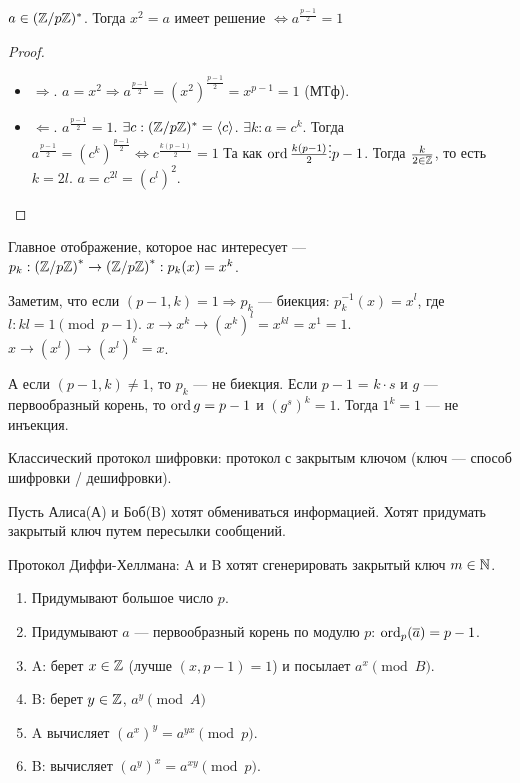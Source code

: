 \begin{theorem}
    $a \in (\mathbb{Z} / p \mathbb{Z})^*$. Тогда  $x^2 = a$ имеет решение  $\iff a^{\frac{p-1}{2}} = 1$
\end{theorem}
\begin{proof}
    \slashn
    \begin{itemize}
        \item $\Rightarrow$.  $a = x^2 \Rightarrow a^{\frac{p-1}{2}} = (x^2)^{\frac{p-1}{2}} = x^{p-1} = 1$ (МТф).
        \item $\Leftarrow$.  $a^{\frac{p-1}{2}} = 1$. $\exists c: (\mathbb{Z} / p \mathbb{Z})^* = \langle c \rangle$.  $\exists k: a = c^k$. Тогда  $a^{\frac{p-1}{2}} = (c^k)^{\frac{p-1}{2}} \iff c^{\frac{k(p-1)}{2}} = 1$ Та как $\operatorname{ord} \frac{k(p-1)}{2} \vdots p - 1$. Тогда  $\frac{k}{2 \in \mathbb{Z}}$, то есть $k = 2l$.  $a = c^{2l} = (c^l)^2$.
    \end{itemize}
\end{proof}
Главное отображение, которое нас интересует --- $p_k: \left(\mathbb{Z} / p\mathbb{Z}\right)^* \to \left(\mathbb{Z} / p\mathbb{Z}\right)^*: p_k(x) = x^k$.

Заметим, что если  $(p - 1,k)=1 \Rightarrow p_k$ --- биекция:  $p_k^{-1}(x) = x^l$, где  $l: kl = 1 \pmod{p-1}$.  $x\to x^k\to(x^k)^l = x^{kl} = x^1 = 1$. $x\to (x^l) \to (x^l)^k = x$.

А если $(p - 1, k) \neq 1$, то $p_k$ --- не биекция. Если  $p - 1$ =  $k \cdot s$ и  $g$ --- первообразный корень, то  $\operatorname{ord} g = p - 1$ и $(g^s)^k = 1$. Тогда  $1^k=1$ --- не инъекция.

Классический протокол шифровки: протокол с закрытым ключом (ключ --- способ шифровки / дешифровки).

Пусть Алиса(А) и Боб(B) хотят обмениваться информацией. Хотят придумать закрытый ключ путем пересылки сообщений. 

Протокол Диффи-Хеллмана: A и B хотят сгенерировать закрытый ключ $m \in \mathbb{N}$.
 \begin{enumerate}
     \item Придумывают большое число $p$.
     \item Придумывают  $a$ --- первообразный корень по модулю  $p$:  $\operatorname{ord}_p(\overline{a}) = p - 1$.
     \item A: берет  $x \in \mathbb{Z}$ (лучше $(x, p - 1) = 1$) и посылает $a^x \pmod{B}$.
     \item B: берет $y \in \mathbb{Z}$,  $a^y \pmod{A}$ 
     \item A вычисляет $\left(a^x\right)^y = a^{yx} \pmod p$.
     \item B: вычисляет $(a^y)^x = a^{xy} \pmod p$.
\end{enumerate}

